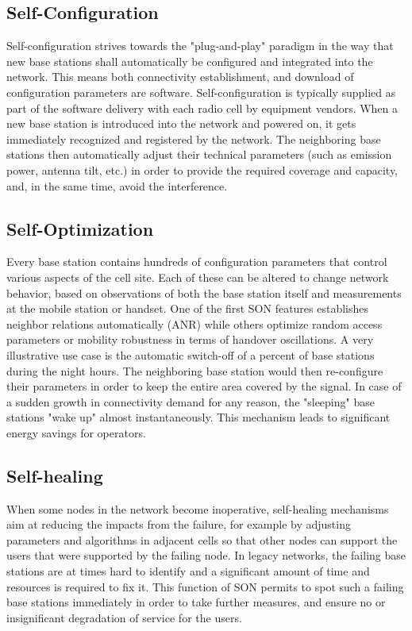 \documentclass[12pt]{article}
\begin{document}
\subsection{Self-Configuration}
Self-configuration strives towards the "plug-and-play" paradigm in the way that new base stations shall automatically be configured and integrated into the network. This means both connectivity establishment, and download of configuration parameters are software. Self-configuration is typically supplied as part of the software delivery with each radio cell by equipment vendors. When a new base station is introduced into the network and powered on, it gets immediately recognized and registered by the network. The neighboring base stations then automatically adjust their technical parameters (such as emission power, antenna tilt, etc.) in order to provide the required coverage and capacity, and, in the same time, avoid the interference.
\subsection{Self-Optimization}
Every base station contains hundreds of configuration parameters that control various aspects of the cell site. Each of these can be altered to change network behavior, based on observations of both the base station itself and measurements at the mobile station or handset. One of the first SON features establishes neighbor relations automatically (ANR) while others optimize random access parameters or mobility robustness in terms of handover oscillations. A very illustrative use case is the automatic switch-off of a percent of base stations during the night hours. The neighboring base station would then re-configure their parameters in order to keep the entire area covered by the signal. In case of a sudden growth in connectivity demand for any reason, the "sleeping" base stations "wake up" almost instantaneously. This mechanism leads to significant energy savings for operators.
\subsection{Self-healing}
When some nodes in the network become inoperative, self-healing mechanisms aim at reducing the impacts from the failure, for example by adjusting parameters and algorithms in adjacent cells so that other nodes can support the users that were supported by the failing node. In legacy networks, the failing base stations are at times hard to identify and a significant amount of time and resources is required to fix it. This function of SON permits to spot such a failing base stations immediately in order to take further measures, and ensure no or insignificant degradation of service for the users.
\end{document}
